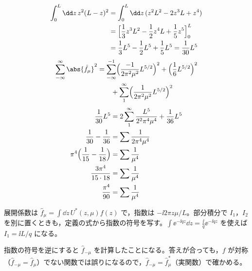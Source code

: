 \begin{align*}
  \int_{0}^{L}\dd z\,z^{2}(L-z)^{2}&=\int_{0}^{L}\dd z\,(z^{2}L^{2}-2z^{3}L+z^{4})\\
  &=\Bigl[\frac{1}{3}z^{3}L^{2}-\frac{1}{2}z^{4}L+\frac{1}{5}z^{5}\Bigr]_{0}^{L}\\
  &=\frac{1}{3}L^{5}-\frac{1}{2}L^{5}+\frac{1}{5}L^{5}=\frac{1}{30}L^{5}
\end{align*}
\begin{align*}
  \sum_{-\infty}^{\infty}\abs{\hat{f}_{\mu}}^{2}&=\sum_{-\infty}^{-1}\Bigl(\frac{-1}{2\pi^{2}\mu^{2}}L^{5/2}\Bigr)^{2}+\Bigl(\frac{1}{6}L^{5/2}\Bigr)^{2}\\
  &\qquad+\sum_{1}^{\infty}\Bigl(\frac{1}{2\pi^{2}\mu^{2}}L^{5/2}\Bigr)^{2}
\end{align*}
\begin{align*}
  \frac{1}{30}L^{5}&=2\sum_{1}^{\infty}\frac{L^{5}}{2^{2}\pi^{4}\mu^{4}}+\frac{1}{36}L^{5}\\
  \frac{1}{30}-\frac{1}{36}&=\sum\frac{1}{2\pi^{4}\mu^{4}}\\
  \pi^{4}\Bigl(\frac{1}{15}-\frac{1}{18}\Bigr)&=\sum\frac{1}{\mu^{4}}\\
  \frac{3\pi^{4}}{15\cdot18}&=\sum\frac{1}{\mu^{4}}\\
  \frac{\pi^{4}}{90}&=\sum\frac{1}{\mu^{4}}
\end{align*}
\item 展開係数は $\hat{f}_{\mu}=\int\dd z\,U^{*}(z,\mu)f(z)$ で，指数は $-\ii2\pi z\mu/L$。部分積分で $I_1$，$I_2$ を別に置くときも，定義の式から指数の符号を写す。$\int\ee^{-\ii qz}\dd z=\frac{\ii}{q}\ee^{-\ii qz}$ を使えば $I_1=\ii L/q$ になる。
\item 指数の符号を逆にすると $\hat{f}_{-\mu}$ を計算したことになる。答えが合っても，$f$ が対称（$\hat{f}_{-\mu}=\hat{f}_{\mu}$）でない関数では誤りになるので，$\hat{f}_{-\mu}=\hat{f}_{\mu}^{*}$（実関数）で確かめる。
